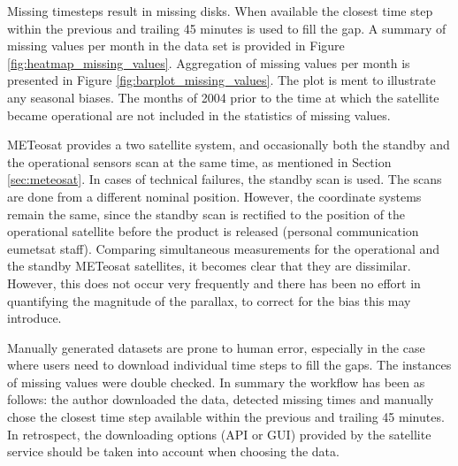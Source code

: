 Missing timesteps result in missing disks. When available the closest time step within the previous and trailing 45 minutes is used to fill the gap. A summary of missing values per month in the data set is provided in Figure \ref{fig:heatmap_missing_values}. Aggregation of missing values per month is presented in Figure \ref{fig:barplot_missing_values}. The plot is ment to illustrate any seasonal biases. The months of 2004 prior to the time at which the satellite became operational are not included in the statistics of missing values.

METeosat provides a two satellite system, and occasionally both the standby and the operational sensors scan at the same time, as mentioned in Section \ref{sec:meteosat}.
In cases of technical failures, the standby scan is used. The scans are done from a different nominal position. However, the coordinate systems remain the same, since the standby scan is rectified to the position of the operational satellite before the product is released (personal communication \acrshort{eumetsat} staff). Comparing simultaneous measurements for the operational and the standby METeosat satellites, it becomes clear that they are dissimilar. However, this does not occur very frequently and there has been no effort in quantifying the magnitude of the parallax, to correct for the bias this may introduce.

Manually generated datasets are prone to human error, especially in the case where users need to download individual time steps to fill the gaps. The instances of missing values were double checked. In summary the workflow has been as follows: the author downloaded the data, detected missing times and manually chose the closest time step available within the previous and trailing 45 minutes. In retrospect, the downloading options (API or GUI) provided by the satellite service should be taken into account when choosing the data.

